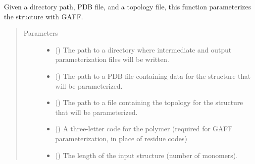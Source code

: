 \documentclass[letterpaper,12pt,english,openany,oneside]{sphinxmanual}
\begin{document}
\begin{fulllineitems}
\label{\detokenize{simulation:simulation.parameterize}}
Given a directory path, PDB file, and a topology file, this function parameterizes the structure with GAFF.
\begin{quote}\begin{description}
\item[{Parameters}] \leavevmode\begin{itemize}
\item {} 
 () \textendash{} The path to a directory where intermediate and output parameterization files will be written.

\item {} 
 () \textendash{} The path to a PDB file containing data for the structure that will be parameterized.

\item {} 
 () \textendash{} The path to a file containing the topology for the structure that will be parameterized.

\item {} 
 (\sphinxstyleliteralemphasis{\sphinxupquote{ (}}\sphinxstyleliteralemphasis{\sphinxupquote{)}}) \textendash{} A three-letter code for the polymer (required for GAFF parameterization, in place of residue codes)

\item {} 
 () \textendash{} The length of the input structure (number of monomers).


\end{itemize}
\end{description}
\end{quote}
\end{fulllineitems}
\end{document}
